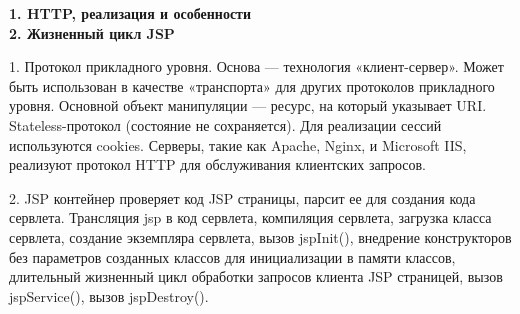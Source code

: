 \documentclass{article}
\begin{document}
\hfill
\begin{minipage}{.3\textwidth}
    \textbf{1. HTTP, реализация и особенности}\\
    \textbf{2. Жизненный цикл JSP}

1. Протокол прикладного уровня. Основа — технология «клиент-сервер». Может быть использован в качестве «транспорта» для других протоколов прикладного уровня. Основной объект манипуляции — ресурс, на который указывает URI. Stateless-протокол (состояние не сохраняется). Для реализации сессий используются cookies.
Серверы, такие как Apache, Nginx, и Microsoft IIS,
реализуют протокол HTTP для обслуживания клиентских запросов.

2. JSP контейнер проверяет код JSP страницы, парсит ее для создания кода сервлета. Трансляция jsp в код сервлета, компиляция сервлета, загрузка класса сервлета, создание экземпляра сервлета, вызов jspInit(), внедрение конструкторов без параметров созданных классов для инициализации в памяти классов, длительный жизненный цикл обработки запросов клиента JSP страницей, вызов jspService(), вызов jspDestroy().
\end{minipage}
\end{document}
